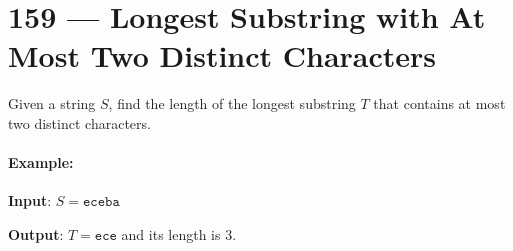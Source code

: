 \section{159 --- Longest Substring with At Most Two Distinct Characters}
Given a string $S$, find the length of the longest substring $T$ that contains at most two distinct characters.

\paragraph{Example:}
\begin{flushleft}
\textbf{Input}: $S = \texttt{eceba}$

\textbf{Output}: $T=\texttt{ece}$ and its length is 3.
\end{flushleft}
